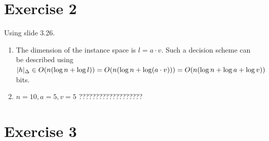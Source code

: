 \documentclass[12pt]{article}
\DeclarePairedDelimiter\abs{\lvert}{\rvert}
\begin{document}
\section*{Exercise 2}
Using slide 3.26.
\begin{enumerate}[label=(\alph*)]
	\item	The dimension of the instance space is $l = a \cdot v$. Such a decision scheme can be described using $\abs{h}_{\Delta} \in O(n(\log n + \log l)) = O(n(\log n + \log (a \cdot v))) = O(n (\log n + \log a + \log v))$ bits.
	\item	$n=10, a = 5, v = 5$ ???????????????????
\end{enumerate}

\section*{Exercise 3}
\end{document}

